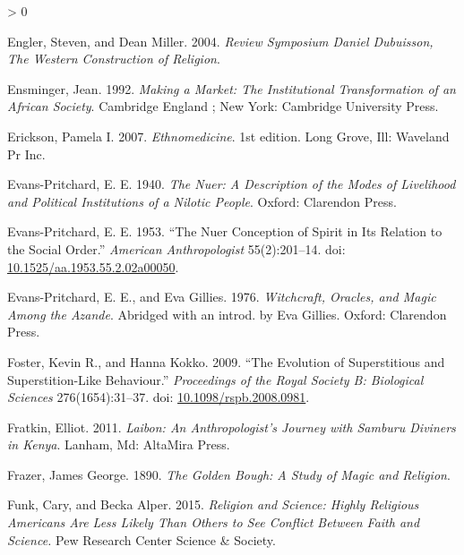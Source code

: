 \documentclass[
  11pt,
]{article}
\newlength{\cslhangindent}
\newenvironment{CSLReferences}[2] %
 {%
  \setlength{\parindent}{0pt}
  \ifodd #1 \everypar{\setlength{\hangindent}{\cslhangindent}}\ignorespaces\fi
  \ifnum #2 > 0
  \setlength{\parskip}{#2\baselineskip}
  \fi
 }%
 {}
\begin{document}
\begin{CSLReferences}{1}{0}
\leavevmode\hypertarget{ref-englerReviewSymposiumDaniel2004}{}%
Engler, Steven, and Dean Miller. 2004. \emph{Review Symposium {Daniel Dubuisson}, {The Western Construction} of {Religion}}.

\leavevmode\hypertarget{ref-ensmingerMakingMarketInstitutional1992}{}%
Ensminger, Jean. 1992. \emph{Making a {Market}: {The Institutional Transformation} of an {African Society}}. {Cambridge England ; New York}: {Cambridge University Press}.

\leavevmode\hypertarget{ref-ericksonEthnomedicine2007}{}%
Erickson, Pamela I. 2007. \emph{Ethnomedicine}. 1st edition. {Long Grove, Ill}: {Waveland Pr Inc}.

\leavevmode\hypertarget{ref-evans-pritchardNuerDescriptionModes1940}{}%
Evans-Pritchard, E. E. 1940. \emph{The {Nuer}: A Description of the Modes of Livelihood and Political Institutions of a {Nilotic} People}. {Oxford}: {Clarendon Press}.

\leavevmode\hypertarget{ref-evans-pritchardNuerConceptionSpirit1953}{}%
Evans-Pritchard, E. E. 1953. {``The {Nuer Conception} of {Spirit} in {Its Relation} to the {Social Order}.''} \emph{American Anthropologist} 55(2):201--14. doi: \href{https://doi.org/10.1525/aa.1953.55.2.02a00050}{10.1525/aa.1953.55.2.02a00050}.

\leavevmode\hypertarget{ref-evans-pritchardWitchcraftOraclesMagic1976}{}%
Evans-Pritchard, E. E., and Eva Gillies. 1976. \emph{Witchcraft, Oracles, and Magic Among the {Azande}}. Abridged with an introd. by Eva Gillies. {Oxford}: {Clarendon Press}.

\leavevmode\hypertarget{ref-fosterEvolutionSuperstitiousSuperstitionlike2009}{}%
Foster, Kevin R., and Hanna Kokko. 2009. {``The Evolution of Superstitious and Superstition-Like Behaviour.''} \emph{Proceedings of the Royal Society B: Biological Sciences} 276(1654):31--37. doi: \href{https://doi.org/10.1098/rspb.2008.0981}{10.1098/rspb.2008.0981}.

\leavevmode\hypertarget{ref-fratkinLaibonAnthropologistJourney2011}{}%
Fratkin, Elliot. 2011. \emph{Laibon: {An Anthropologist}'s {Journey} with {Samburu Diviners} in {Kenya}}. {Lanham, Md}: {AltaMira Press}.

\leavevmode\hypertarget{ref-frazerGoldenBoughStudy2003}{}%
Frazer, James George. 1890. \emph{The {Golden Bough}: {A Study} of {Magic} and {Religion}}.

\leavevmode\hypertarget{ref-funkReligionScienceHighly2015}{}%
Funk, Cary, and Becka Alper. 2015. \emph{Religion and {Science}: {Highly} Religious {Americans} Are Less Likely Than Others to See Conflict Between Faith and Science.} {Pew Research Center Science \& Society.}


\end{CSLReferences}
\end{document}
